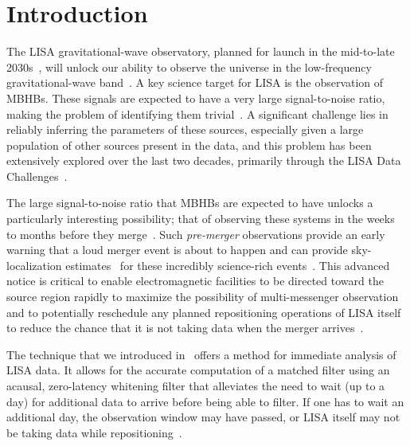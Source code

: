 \documentclass[%
 reprint,
superscriptaddress,
 nofootinbib,
 amsmath,amssymb,
 aps,
 prd,
]{revtex4-2}
\begin{document}
\section{Introduction}
\label{sec:intro}

The \ac{LISA} gravitational-wave observatory, planned for launch in the mid-to-late
2030s~\cite{LISA:2017pwj, Colpi:2024xhw}, will unlock our ability to observe the universe
in the low-frequency gravitational-wave band~\cite{LISA:2022yao}. A key science target
for \ac{LISA} is the observation of \acp{MBHB}. These signals are expected to have a very large
signal-to-noise ratio, making the problem of identifying them trivial~\cite{LISA:2022yao}.
A significant challenge lies in reliably inferring the parameters of these sources, especially
given a large population of other sources present in the data, and this problem has been
extensively explored over the last two decades, primarily through the LISA Data
Challenges~\cite{Arnaud:2006gm, MockLISADataChallengeTaskForce:2006sgi, Arnaud:2007vr,
MockLISADataChallengeTaskForce:2007iof, Babak:2008aa, Arnaud:2007jy,
MockLISADataChallengeTaskForce:2009wir, Baghi:2022ucj, LDC_WEBSITE}.

The large signal-to-noise ratio that \acp{MBHB} are expected to have unlocks a particularly
interesting possibility; that of observing these systems
in the weeks to months before they merge~\cite{CabournDavies:2024hea, Houba:2024mqj,
Ruan:2024qch}. Such \textit{pre-merger} observations provide an early warning that a loud merger
event is about to happen and can provide sky-localization
estimates~\cite{CabournDavies:2024hea, Kocsis:2007yu, McWilliams:2011zs, Saini:2022hrs}
for these incredibly science-rich events~\cite{DalCanton:2019wsr}.
This advanced notice is critical to enable
electromagnetic facilities to be directed toward the source region rapidly to maximize
the possibility of multi-messenger observation and to potentially reschedule any planned repositioning operations of \ac{LISA} itself 
to reduce the chance that it is not taking data when the merger arrives~\cite{Colpi:2024xhw,Castelli:2024sdb}.

The technique that we introduced in~\cite{CabournDavies:2024hea} offers a method for immediate analysis of LISA data.
It allows for the accurate computation of a matched filter using an acausal, zero-latency whitening filter that alleviates the need to wait (up to a day) for additional data to arrive before being able to filter.
If one has to wait an additional day, the observation window may have passed, or \ac{LISA} itself may not be taking data while repositioning~\cite{Colpi:2024xhw,Castelli:2024sdb}.
\end{document}
